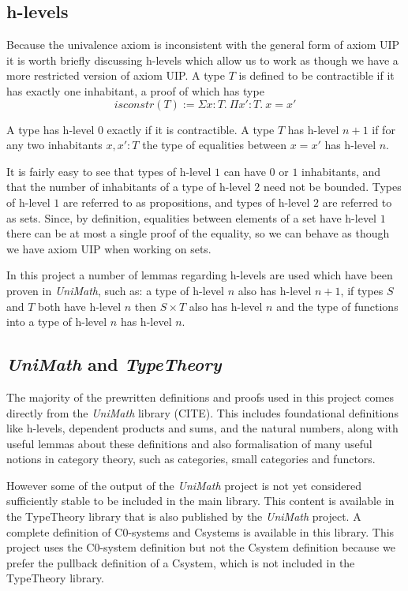 \subsection{h-levels}
Because the univalence axiom is inconsistent with the general form of axiom UIP
it is worth briefly discussing h-levels which allow us to work as though we have
a more restricted version of axiom UIP. A type $T$ is defined to be contractible
if it has exactly one inhabitant, a proof of which has type
\[isconstr(T) := \Sigma x:T.\ \Pi x':T.\ x=x'\]

A type has h-level $0$ exactly if it is contractible. A type $T$ has h-level
$n+1$ if for any two inhabitants $x, x': T$ the type of equalities between
$x=x'$ has h-level $n$.

It is fairly easy to see that types of h-level $1$ can have $0$ or $1$
inhabitants, and that the number of inhabitants of a type of h-level $2$ need
not be bounded. Types of h-level $1$ are referred to as propositions, and types
of h-level $2$ are referred to as sets. Since, by definition, equalities between
elements of a set have h-level $1$ there can be at most a single proof of the
equality, so we can behave as though we have axiom UIP when working on sets.

In this project a number of lemmas regarding h-levels are used which have been
proven in \textit{UniMath}, such as: a type of h-level $n$ also has h-level
$n+1$, if types $S$ and $T$ both have h-level $n$ then $S\times T$ also has
h-level $n$ and the type of functions into a type of h-level $n$ has h-level
$n$.

\subsection{\textit{UniMath} and \textit{TypeTheory}}
The majority of the prewritten definitions and proofs used in this project comes
directly from the \textit{UniMath} library (CITE). This includes foundational
definitions like h-levels, dependent products and sums, and the natural numbers,
along with useful lemmas about these definitions and also formalisation of many
useful notions in category theory, such as categories, small categories and
functors.

However some of the output of the \textit{UniMath} project is not yet considered
sufficiently stable to be included in the main library. This content is
available in the TypeTheory library that is also published by the
\textit{UniMath} project. A complete definition of C0-systems and Csystems is
available in this library. This project uses the C0-system definition but not
the Csystem definition because we prefer the pullback definition of a Csystem,
which is not included in the TypeTheory library.
